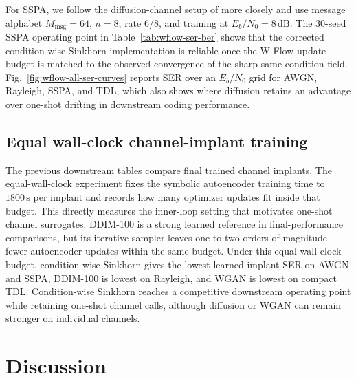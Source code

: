 \documentclass[10pt,journal]{IEEEtran}
\begin{document}


For SSPA, we follow the diffusion-channel setup of \cite{paper2309} more closely and use message alphabet \(M_{\mathrm{msg}}=64\), \(n=8\), rate \(6/8\), and training at \(E_b/N_0=8\,\mathrm{dB}\).
The 30-seed SSPA operating point in Table~\ref{tab:wflow-ser-ber} shows that the corrected condition-wise Sinkhorn implementation is reliable once the W-Flow update budget is matched to the observed convergence of the sharp same-condition field.
Fig.~\ref{fig:wflow-all-ser-curves} reports SER over an \(E_b/N_0\) grid for AWGN, Rayleigh, SSPA, and TDL, which also shows where diffusion retains an advantage over one-shot drifting in downstream coding performance.



\subsection{Equal wall-clock channel-implant training}
The previous downstream tables compare final trained channel implants.
The equal-wall-clock experiment fixes the symbolic autoencoder training time to \(1800\,\mathrm{s}\) per implant and records how many optimizer updates fit inside that budget.
This directly measures the inner-loop setting that motivates one-shot channel surrogates.
DDIM-100 is a strong learned reference in final-performance comparisons, but its iterative sampler leaves one to two orders of magnitude fewer autoencoder updates within the same budget.
Under this equal wall-clock budget, condition-wise Sinkhorn gives the lowest learned-implant SER on AWGN and SSPA, DDIM-100 is lowest on Rayleigh, and WGAN is lowest on compact TDL.
Condition-wise Sinkhorn reaches a competitive downstream operating point while retaining one-shot channel calls, although diffusion or WGAN can remain stronger on individual channels.





\section{Discussion}
\end{document}
